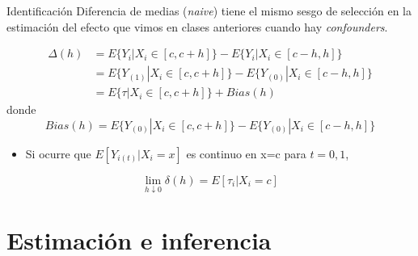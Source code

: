 \documentclass[
  ignorenonframetext,
]{beamer}
\providecommand{\tightlist}{%
  \setlength{\itemsep}{0pt}\setlength{\parskip}{0pt}}
\begin{document}
\begin{frame}{Identificación}
\protect\hypertarget{identificaciuxf3n-2}{}
Diferencia de medias (\emph{naive}) tiene el mismo sesgo de selección en
la estimación del efecto que vimos en clases anteriores cuando hay
\emph{confounders}.

\[
\begin{aligned}
\Delta(h) &= E\{Y_i | X_i \in [c, c+h]\} - E\{Y_i | X_i \in [c-h, h]\} \\
          &= E\{Y_{(1)} | X_i \in [c, c+h]\} - E\{Y_{(0)} | X_i \in [c-h, h]\} \\ 
          &= E\{\tau | X_i \in [c, c+h]\} + Bias(h)
\end{aligned}
\] donde
\[Bias(h) = E\{Y_{(0)} | X_i \in [c, c+h]\} - E\{Y_{(0)} | X_i \in [c-h, h]\}\]

\begin{itemize}
\tightlist
\item
  Si ocurre que \(E[Y_{i(t)}|X_i=x]\) es continuo en x=c para \(t=0,1\),
\end{itemize}

\[\lim_{h \downarrow  0}\delta (h) = E[ \tau_i | X_i = c] \]
\end{frame}

\hypertarget{estimaciuxf3n-e-inferencia}{%
\section{Estimación e inferencia}\label{estimaciuxf3n-e-inferencia}}
\end{document}
